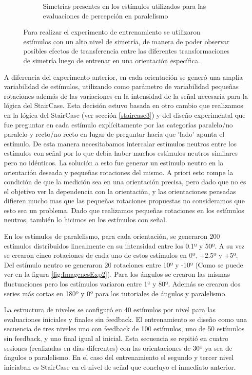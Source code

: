\documentclass{article}
\begin{document}
\begin{figure}
\begin{subfigure}{.53\textwidth}
            \caption{Simetrias presentes en los estímulos utilizados para las evaluaciones de percepción en paralelismo}
        \end{subfigure}
        \caption{Para realizar el experimento de entrenamiento se utilizaron estímulos con un alto nivel de simetría, de manera de poder observar posibles efectos de transferencia entre las diferentes transformaciones de simetría luego de entrenar en una orientación específica.}
        \label{fig:simetrias}
    \end{figure}

    A diferencia del experimento anterior, en cada orientación se generó una amplia variabilidad de estímulos, utilizando como parámetro de variabilidad pequeñas rotaciones además de las variaciones en la intensidad de la señal necesaria para la lógica del StairCase. Esta decisión estuvo basada en otro cambio que realizamos en la lógica del StairCase (ver sección \ref{staircase3}) y del diseño experimental que fue preguntar en cada estímulo explícitamente por las categorías paralelo/no paralelo y recto/no recto en lugar de preguntar hacia que 'lado' apunta el estímulo. De esta manera necesitabamos intercalar estímulos neutros entre los estímulos con señal por lo que debía haber muchos estímulos neutros similares pero no idénticos. La solución a esto fue generar un estimulo neutro en la orientación deseada y pequeñas rotaciones del mismo. A priori esto rompe la condición de que la medición sea en una orientación precisa, pero dado que no es el objetivo ver la dependencia con la orientación, y las orientaciones pensadas difieren mucho mas que las pequeñas rotaciones propuestas no consideramos que esto sea un problema. Dado que realizamos pequeñas rotaciones en los estímulos neutros, también lo hicimos en los estímulos con señal.
    
    En los estímulos de paralelismo, para cada orientación, se generaron 200 estímulos distribuidos linealmente en su intensidad entre los 0.1º y 50º. A su vez se crearon cinco rotaciones de cada uno de estos estímulos en 0º, $\pm$2.5º y $\pm$5º. Del estímulo neutro se generaron 20 rotaciones entre 10º y -10º (Como se puede ver en la figura \ref{fig:ImagenesExp2}). Para los ángulos se crearon las mismas fluctuaciones pero los estímulos variaron entre 1º y 80º. Además se crearon dos series más cortas en 180º y 0º para los tutoriales de ángulos y paralelismo. 
    
    La estructura de niveles se configuró en 40 estímulos por nivel para las evaluaciones iniciales y finales sin feedback. El entrenamiento se diseño como una secuencia de tres niveles uno con feedback de 100 estímulos, uno de 50 estímulos sin feedback, y uno final igual al inicial. Esta secuencia se repitió en cuatro sesiones (realizadas en días diferentes) con las orientaciones de 30º ya sea de ángulos o paralelismo. En el caso del entrenamiento el segundo y tercer nivel iniciaban es StairCase en el nivel de señal que concluyo el inmediato anterior. 
    
\end{document}

